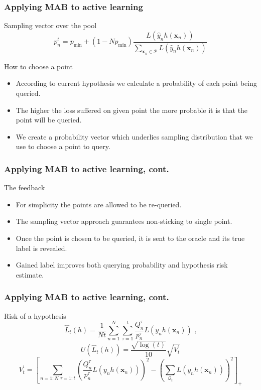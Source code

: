 \documentclass{beamer}
\begin{document}
  \begin{frame}
  \frametitle{Applying MAB to active learning}
  \begin{alertblock}{Sampling vector over the pool}
    $$
    p_n^t = p_{\text{min}} + (1-Np_{\text{min}}) 
    \frac{L(\hat{y}_n h(\mathbf{x}_n))}{\sum_{\mathbf{x}_n \in \mathscr{P}} L(\hat{y}_n h(\mathbf{x}_n))}
    $$
  \end{alertblock}
  \begin{block}{How to choose a point}
    \begin{itemize}
      \item According to current hypothesis we calculate a probability of each point being queried.
      \item The higher the loss suffered on given point the more probable it is that the point will be queried.
      \item We create a probability vector which underlies sampling distribution that we use to choose a point to query.
    \end{itemize}
  \end{block}
  \end{frame}
  \begin{frame}
  \frametitle{Applying MAB to active learning, cont.}
  \begin{block}{The feedback}
    \begin{itemize}
      \item For simplicity the points are allowed to be re-queried.
      \item The sampling vector approach guarantees non-sticking to single point.
      \item Once the point is chosen to be queried, it is sent to the oracle and its true label is revealed.
      \item Gained label improves both querying probability and hypothesis risk estimate.
    \end{itemize}
  \end{block}
  \end{frame}
  \begin{frame}
  \frametitle{Applying MAB to active learning, cont.}
  \begin{alertblock}{Risk of a hypothesis}
  $$
  \hat{L}_t(h) = \frac{1}{Nt} \sum_{n=1}^{N} \sum_{\tau = 1}^{t} 
\frac{Q^{\tau}_n}{p^{\tau}_n} L(y_n h(\mathbf{x}_n)) \text{~,}
  $$
  $$U(\hat{L}_t(h)) = \frac{ \sqrt{ \log(t) } }
                       { 10 }
                  \sqrt{ V^\prime_t }$$
  $$V^\prime_t = \left[
  \sum_{n = 1:N \text{~} \tau = 1:t} \left( \frac{Q^\tau_n}{p^\tau_n} L(y_n h(\mathbf{x}_n)) \right)^2
  -
  \left( \sum_{\mathscr{Q}_t} L(y_n h(\mathbf{x}_n)) \right)^2
\right]_+$$
  \end{alertblock}
  \end{frame}
\end{document}
